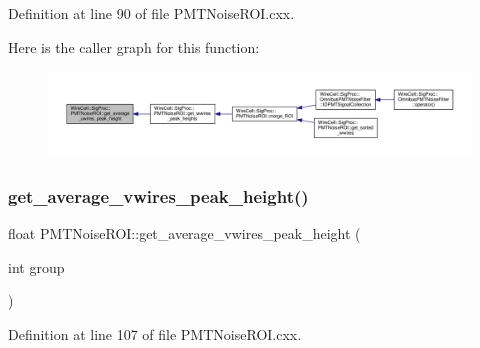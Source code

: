 Definition at line 90 of file P\+M\+T\+Noise\+R\+O\+I.\+cxx.

Here is the caller graph for this function\+:
\nopagebreak
\begin{figure}[H]
\begin{center}
\leavevmode
\includegraphics[width=350pt]{class_wire_cell_1_1_sig_proc_1_1_p_m_t_noise_r_o_i_a3a991d86acfa1be6a8070ac516a624c9_icgraph}
\end{center}
\end{figure}
\mbox{\label{class_wire_cell_1_1_sig_proc_1_1_p_m_t_noise_r_o_i_aeff495991c25c4ff4091eb839835e230}} 
\subsubsection{\texorpdfstring{get\+\_\+average\+\_\+vwires\+\_\+peak\+\_\+height()}{get\_average\_vwires\_peak\_height()}}
{\footnotesize\ttfamily float P\+M\+T\+Noise\+R\+O\+I\+::get\+\_\+average\+\_\+vwires\+\_\+peak\+\_\+height (\begin{DoxyParamCaption}\item[{int}]{group }\end{DoxyParamCaption})}



Definition at line 107 of file P\+M\+T\+Noise\+R\+O\+I.\+cxx.

